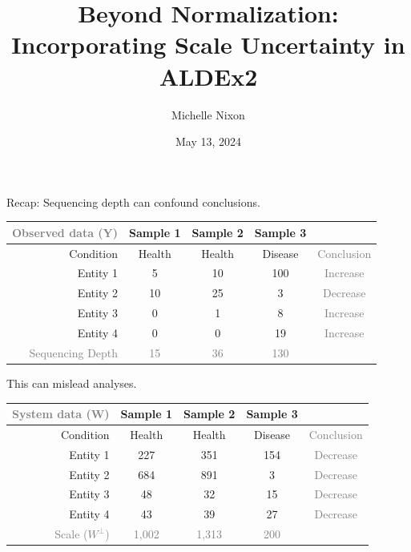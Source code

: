 \documentclass[
  ignorenonframetext,
]{beamer}
\title{Beyond Normalization: Incorporating Scale Uncertainty in ALDEx2}
\author{Michelle Nixon}
\date{May 13, 2024}
\begin{document}
\frame{\titlepage}

\begin{frame}{Recap: Sequencing depth can confound conclusions.}
\protect\hypertarget{recap-sequencing-depth-can-confound-conclusions.}{}
\begin{table}[h!]
\centering
\begin{tabular}{|r|c c c| c|}
\hline
\textcolor{gray}{Observed data (Y)} & Sample 1 & Sample 2 & Sample 3  &\\
\hline
Condition & Health & Health & Disease & \textcolor{gray}{Conclusion}\\
\hline
Entity 1 & 5 & 10 & 100 & \textcolor{gray}{Increase}\\
Entity 2 & 10 & 25 & 3 & \textcolor{gray}{Decrease}\\
Entity 3 & 0 & 1 & 8 & \textcolor{gray}{Increase}\\
Entity 4 & 0 & 0 & 19 &\textcolor{gray}{Increase}\\
\hline
\textcolor{gray}{Sequencing Depth} & \textcolor{gray}{15} & \textcolor{gray}{36} & \textcolor{gray}{130} &\\
\hline
\end{tabular}
\end{table}
\end{frame}

\begin{frame}{This can mislead analyses.}
\protect\hypertarget{this-can-mislead-analyses.}{}
\begin{table}[h!]
\centering
\begin{tabular}{|r|c c c| c|}
\hline
\textcolor{gray}{System data (W)} & Sample 1 & Sample 2 & Sample 3  & \\
\hline
Condition & Health & Health & Disease & \textcolor{gray}{Conclusion}\\
\hline
Entity 1 & 227 & 351 & 154 & \textcolor{gray}{Decrease}\\
Entity 2 & 684 & 891 & 3 & \textcolor{gray}{Decrease}\\
Entity 3 & 48 & 32 & 15 & \textcolor{gray}{Decrease}\\
Entity 4 & 43 & 39  & 27 &\textcolor{gray}{Decrease}\\
\hline
\textcolor{gray}{Scale ($W^\perp$)} & \textcolor{gray}{1,002} & \textcolor{gray}{1,313} & \textcolor{gray}{200} &\\
\hline
\end{tabular}
\end{table}
\end{frame}
\end{document}
